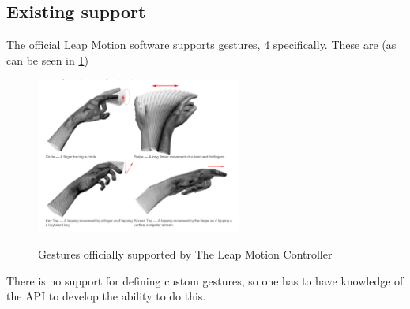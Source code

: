 \documentclass[a4paper]{article}
\begin{document}
\subsection{Existing support}
The official Leap Motion software supports gestures, 4 specifically. These are (as can be seen in \ref{4Gestures})\\
\begin{figure}[!h]
\centerline{\includegraphics[width=0.6\textwidth]{4Gestures.png}}
\caption{Gestures officially supported by The Leap Motion Controller}
\label{4Gestures}\cite{Leap Overview}
\end{figure}
There is no support for defining custom gestures, so one has to have knowledge of the API to develop the ability to do this.
\newpage
\end{document}
